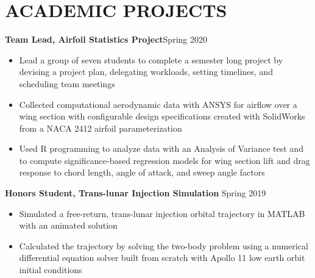 \documentclass{article}
\begin{document}
\section{ACADEMIC PROJECTS}

\textbf{Team Lead, Airfoil Statistics Project}\hfill Spring 2020
\vspace{0.5em}
\begin{itemize}
	\item Lead a group of seven students to complete a semester long project by devising a project plan, delegating workloads, setting timelines, and scheduling team meetings
	\item Collected computational aerodynamic data with ANSYS for airflow over a wing section with configurable design specifications created with SolidWorks from a NACA 2412 airfoil parameterization
	\item Used R programming to analyze data with an Analysis of Variance test and to compute significance-based regression models for wing section lift and drag response to chord length, angle of attack, and sweep angle factors
\end{itemize}
\vspace{1em}
\textbf{Honors Student, Trans-lunar Injection Simulation} 
\hfill
Spring 2019
\vspace{0.5em}
\begin{itemize}
	\item Simulated a free-return, trans-lunar injection orbital trajectory in MATLAB with an animated solution
	\item Calculated the trajectory by solving the two-body problem using a numerical differential equation solver built from scratch with Apollo 11 low earth orbit initial conditions
\end{itemize}

\thispagestyle{empty}
\end{document}
